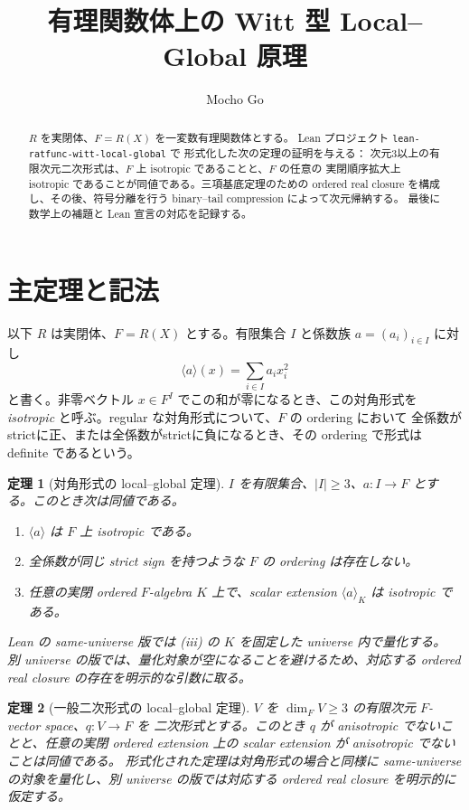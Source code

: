 \documentclass[uplatex,dvipdfmx]{jsarticle}
\title{有理関数体上の Witt 型 Local--Global 原理}
\author{Mocho Go}
\date{}
\newtheorem{theorem}{定理}
\theoremstyle{definition}
\theoremstyle{remark}
\begin{document}
\maketitle

\begin{abstract}
$R$ を実閉体、$F=R(X)$ を一変数有理関数体とする。
Lean プロジェクト \texttt{lean-ratfunc-witt-}\allowbreak\texttt{local-global} で
形式化した次の定理の証明を与える：
次元3以上の有限次元二次形式は、$F$ 上 isotropic であることと、$F$ の任意の
実閉順序拡大上 isotropic であることが同値である。三項基底定理のための ordered real
closure を構成し、その後、符号分離を行う binary--tail compression によって次元帰納する。
最後に数学上の補題と Lean 宣言の対応を記録する。
\end{abstract}

\section{主定理と記法}

以下 $R$ は実閉体、$F=R(X)$ とする。有限集合 $I$ と係数族
$a=(a_i)_{i\in I}$ に対し
\[
  \langle a\rangle(x)=\sum_{i\in I}a_i x_i^2
\]
と書く。非零ベクトル $x\in F^I$ でこの和が零になるとき、この対角形式を
\emph{isotropic} と呼ぶ。regular な対角形式について、$F$ の ordering において
全係数がstrictに正、または全係数がstrictに負になるとき、その ordering で形式は
definite であるという。

\begin{theorem}[対角形式の local--global 定理]\label{thm:diagonal-ja}
$I$ を有限集合、$|I|\ge3$、$a:I\to F$ とする。このとき次は同値である。
\begin{enumerate}[label=(\roman*)]
  \item $\langle a\rangle$ は $F$ 上 isotropic である。
  \item 全係数が同じ strict sign を持つような $F$ の ordering は存在しない。
  \item 任意の実閉 ordered $F$-algebra $K$ 上で、scalar extension
        $\langle a\rangle_K$ は isotropic である。
\end{enumerate}
Lean の same-universe 版では (iii) の $K$ を固定した universe 内で量化する。
別 universe の版では、量化対象が空になることを避けるため、対応する ordered real
closure の存在を明示的な引数に取る。
\end{theorem}

\begin{theorem}[一般二次形式の local--global 定理]\label{thm:qf-ja}
$V$ を $\dim_F V\ge3$ の有限次元 $F$-vector space、$q:V\to F$ を
二次形式とする。このとき $q$ が anisotropic でないことと、任意の実閉 ordered
extension 上の scalar extension が anisotropic でないことは同値である。
形式化された定理は対角形式の場合と同様に same-universe の対象を量化し、別 universe
の版では対応する ordered real closure を明示的に仮定する。
\end{theorem}
\end{document}
